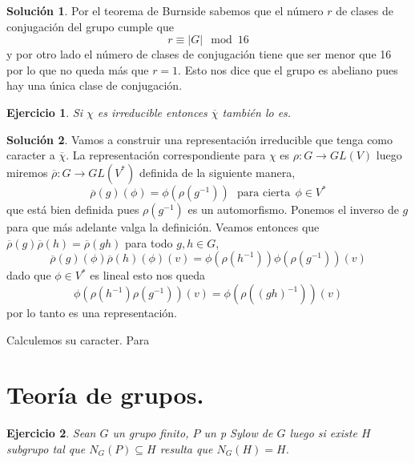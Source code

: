 \documentclass[11pt]{article}
\theoremstyle{plain}
\newtheorem*{ej}{Ejercicio}
\theoremstyle{definition}
\newtheorem*{sol}{Solución}
\theoremstyle{remark}
\begin{document}
\begin{sol}
	Por el teorema de Burnside sabemos que el número $r$ de clases de conjugación del grupo cumple que 
	\[
	r \equiv |G|  \mod 16
	\]
	y por otro lado el número de clases de conjugación tiene que ser menor que 16 por lo que no queda más que $r=1$. Esto nos dice que el grupo es abeliano pues hay una única clase de conjugación.
\end{sol}

\newpage
\begin{tcolorbox}[colback=teal!25!white,colframe=teal!75!black]
	\begin{ej}
		Si $\chi$ es irreducible entonces $\overline \chi$ también lo es.
	\end{ej}	
\end{tcolorbox}
\medskip

\begin{sol}	
	Vamos a construir una representación irreducible que tenga como caracter a $\overline \chi$. La representación correspondiente para $\chi$ es $\rho: G \to GL(V)$ luego miremos $\overline{\rho}: G \to GL(V^{*})$ definida de la siguiente manera,
	\[
	\overline \rho (g) (\phi) = \phi(\rho(g^{-1}))  \ \ \ \text{para cierta} \ \ \phi \in V^*
	\]
	que está bien definida pues $\rho(g^{-1})$ es un automorfismo. Ponemos el inverso de $g$ para que más adelante valga la definición. Veamos entonces que $\overline\rho(g)\overline\rho(h) = \overline\rho (gh)$ para todo $g,h \in G$,
	\[
	\overline\rho(g)(\phi)	\overline\rho(h)(\phi)(v) = \phi(\rho(h^{-1}))\phi(\rho(g^{-1}))(v)
	\] 
	dado que $\phi \in V^*$ es lineal esto nos queda
	\[
	\phi(\rho(h^{-1})\rho(g^{-1}))(v) = \phi(\rho((gh)^{-1}))(v) 
	\]
	por lo tanto es una representación. 
	
	Calculemos su caracter. Para
\end{sol}




\newpage
\section{Teoría de grupos.}


\begin{tcolorbox}[colback=teal!25!white,colframe=teal!75!black]
	\begin{ej}
		Sean $G$ un grupo finito, $P$ un p Sylow de $G$ luego si existe $H$ subgrupo tal que $N_G(P) \subseteq H$ resulta que $N_G(H) = H$.
 	\end{ej}	
\end{tcolorbox}
\medskip
\end{document}
